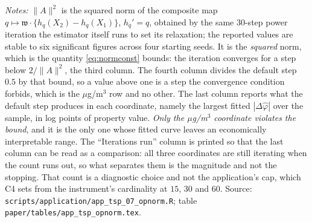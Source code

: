 \documentclass[
  12pt]{article}
\newcommand{\1}[1]{\mathds{1}\left[#1\right]}
\theoremstyle{plain}
\theoremstyle{definition}
\theoremstyle{definition}
\theoremstyle{remark}
\begin{document}
\begin{table}[!htbp]
\centering
\begin{threeparttable}
\caption{The operator's squared norm in three coordinates, and what the default
Landweber step does in each}
\label{tab:supp-app-opnorm}
\footnotesize

\begin{tablenotes}\footnotesize
\item \textit{Notes:} $\|A\|^{2}$ is the squared norm of the composite map
$q\mapsto\mathfrak w\cdot\{h_q(X_2)-h_q(X_1)\}$, $h_q'=q$, obtained by the same
$30$-step power iteration the estimator itself runs to set its relaxation; the
reported values are stable to six significant figures across four starting
seeds. It is the \emph{squared} norm, which is the quantity
\eqref{eq:normconst} bounds: the iteration converges for a step below
$2/\|A\|^{2}$, the third column. The fourth column divides the default step
$0.5$ by that bound, so a value above one is a step the convergence condition
forbids, which is the $\mu$g/m$^3$ row and no other. The last column reports what
the default step produces in each coordinate, namely the largest fitted
$|\Delta\hat\varphi|$ over the sample, in log points of property value. \emph{Only the $\mu$g/m$^3$ coordinate violates the bound}, and it is the
only one whose fitted curve leaves an economically interpretable range. The
``Iterations run'' column is printed so that the last column can be read as a
comparison: all three coordinates are still iterating when the count runs out,
so what separates them is the magnitude and not the stopping. That count is a
diagnostic choice and not the application's cap, which C4 sets from the
instrument's cardinality at $15$, $30$ and $60$.
Source:
\texttt{scripts/application/app\_tsp\_07\_opnorm.R}; table
\texttt{paper/tables/app\_tsp\_opnorm.tex}.
\end{tablenotes}
\end{threeparttable}
\end{table}
\end{document}
